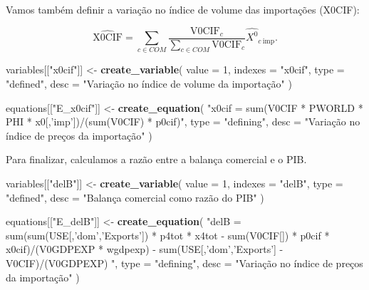 \documentclass[12pt,twoside]{article}
\newenvironment{Shaded}{\begin{snugshade}}{\end{snugshade}}
\newcommand{\DataTypeTok}[1]{\textcolor[rgb]{0.13,0.29,0.53}{#1}}
\newcommand{\DecValTok}[1]{\textcolor[rgb]{0.00,0.00,0.81}{#1}}
\newcommand{\KeywordTok}[1]{\textcolor[rgb]{0.13,0.29,0.53}{\textbf{#1}}}
\newcommand{\NormalTok}[1]{#1}
\newcommand{\StringTok}[1]{\textcolor[rgb]{0.31,0.60,0.02}{#1}}
\let\oldShaded\Shaded
\let\endoldShaded\endShaded
\renewenvironment{Shaded}{\footnotesize\oldShaded}{\endoldShaded}
\begin{document}
Vamos também definir a variação no índice de volume das importações
(X0CIF):

\[\hat{\text{X0CIF}} = \sum_{c\in COM}\frac{\text{V0CIF}_{c}}{\sum_{c\in COM}\text{V0CIF}_{c}}\hat{X^0}_{c~\text{imp}}.\]

\begin{Shaded}
\begin{Highlighting}[]
\NormalTok{variables[[}\StringTok{"x0cif"}\NormalTok{]] <-}\StringTok{ }\KeywordTok{create_variable}\NormalTok{(}
  \DataTypeTok{value =} \DecValTok{1}\NormalTok{,}
  \DataTypeTok{indexes =} \StringTok{"x0cif"}\NormalTok{,}
  \DataTypeTok{type =} \StringTok{"defined"}\NormalTok{,}
  \DataTypeTok{desc =} \StringTok{"Variação no índice de volume da importação"}
\NormalTok{)}

\NormalTok{equations[[}\StringTok{"E_x0cif"}\NormalTok{]] <-}\StringTok{ }\KeywordTok{create_equation}\NormalTok{(}
  \StringTok{"x0cif = sum(V0CIF * PWORLD * PHI * x0[,'imp'])/(sum(V0CIF) * p0cif)"}\NormalTok{,}
  \DataTypeTok{type =} \StringTok{"defining"}\NormalTok{,}
  \DataTypeTok{desc =} \StringTok{"Variação no índice de preços da importação"}
\NormalTok{)}
\end{Highlighting}
\end{Shaded}

Para finalizar, calculamos a razão entre a balança comercial e o PIB.

\begin{Shaded}
\begin{Highlighting}[]
\NormalTok{variables[[}\StringTok{"delB"}\NormalTok{]] <-}\StringTok{ }\KeywordTok{create_variable}\NormalTok{(}
  \DataTypeTok{value =} \DecValTok{1}\NormalTok{,}
  \DataTypeTok{indexes =} \StringTok{"delB"}\NormalTok{,}
  \DataTypeTok{type =} \StringTok{"defined"}\NormalTok{,}
  \DataTypeTok{desc =} \StringTok{"Balança comercial como razão do PIB"}
\NormalTok{)}

\NormalTok{equations[[}\StringTok{"E_delB"}\NormalTok{]] <-}\StringTok{ }\KeywordTok{create_equation}\NormalTok{(}
  \StringTok{"delB = sum(sum(USE[,'dom','Exports']) * p4tot * x4tot - }
\StringTok{    sum(V0CIF[]) * p0cif * x0cif)/(V0GDPEXP * wgdpexp) - }
\StringTok{    sum(USE[,'dom','Exports'] - V0CIF)/(V0GDPEXP) "}\NormalTok{,}
  \DataTypeTok{type =} \StringTok{"defining"}\NormalTok{,}
  \DataTypeTok{desc =} \StringTok{"Variação no índice de preços da importação"}
\NormalTok{)}
\end{Highlighting}
\end{Shaded}
\end{document}
